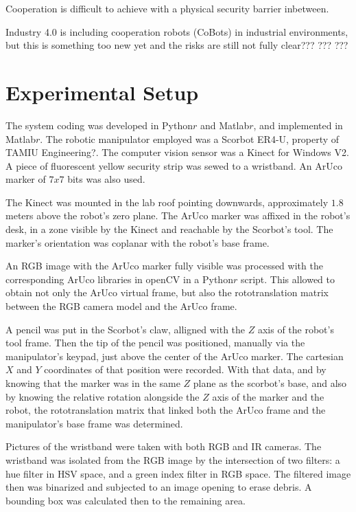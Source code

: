 \documentclass[12pt,a4paper,titlepage]{article}
\begin{document}
Cooperation is difficult to achieve with a physical security barrier inbetween.

Industry 4.0 is including cooperation robots (CoBots) in industrial environments, but this is something too new yet and the risks are still not fully clear???
???
???

\section{Experimental Setup}
The system coding was developed in Python$r$ and Matlab$r$, and implemented in Matlab$r$. The robotic manipulator employed was a Scorbot ER4-U, property of TAMIU Engineering?. The computer vision sensor was a Kinect for Windows V2. A piece of fluorescent yellow security strip was sewed to a wristband. An ArUco marker of $7x7$ bits was also used.

The Kinect was mounted in the lab roof pointing downwards, approximately $1.8$ meters above the robot's zero plane. The ArUco marker was affixed in the robot's desk, in a zone visible by the Kinect and reachable by the Scorbot's tool. The marker's orientation was coplanar with the robot's base frame.

An RGB image with the ArUco marker fully visible was processed with the corresponding ArUco libraries in openCV in a Python$r$ script. This allowed to obtain not only the ArUco virtual frame, but also the rototranslation matrix between the RGB camera model and the ArUco frame.

A pencil was put in the Scorbot's claw, alligned with the $Z$ axis of the robot's tool frame. Then the tip of the pencil was positioned, manually via the manipulator's keypad, just above the center of the ArUco marker. The cartesian $X$ and $Y$ coordinates of that position were recorded. With that data, and by knowing that the marker was in the same $Z$ plane as the scorbot's base, and also by knowing the relative rotation alongside the $Z$ axis of the marker and the robot, the rototranslation matrix that linked both the ArUco frame and the manipulator's base frame was determined. 

Pictures of the wristband were taken with both RGB and IR cameras. The wristband was isolated from the RGB image by the intersection of two filters: a hue filter in HSV space, and a green index filter in RGB space. The filtered image then was binarized and subjected to an image opening to erase debris. A bounding box was calculated then to the remaining area.
\end{document}
